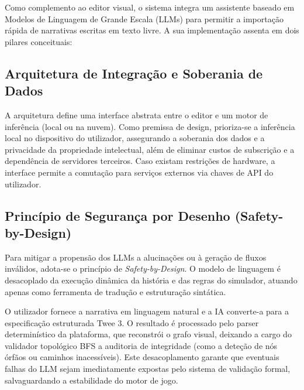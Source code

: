 Como complemento ao editor visual, o sistema integra um assistente baseado em Modelos de Linguagem de Grande Escala (LLMs) para permitir a importação rápida de narrativas escritas em texto livre. A sua implementação assenta em dois pilares conceituais:

\subsection{Arquitetura de Integração e Soberania de Dados}
A arquitetura define uma interface abstrata entre o editor e um motor de inferência (local ou na nuvem). Como premissa de design, prioriza-se a inferência local no dispositivo do utilizador, assegurando a soberania dos dados e a privacidade da propriedade intelectual, além de eliminar custos de subscrição e a dependência de servidores terceiros. Caso existam restrições de hardware, a interface permite a comutação para serviços externos via chaves de API do utilizador.

\subsection{Princípio de Segurança por Desenho (Safety-by-Design)}
Para mitigar a propensão dos LLMs a alucinações ou à geração de fluxos inválidos, adota-se o princípio de \textit{Safety-by-Design}. O modelo de linguagem é desacoplado da execução dinâmica da história e das regras do simulador, atuando apenas como ferramenta de tradução e estruturação sintática. 

O utilizador fornece a narrativa em linguagem natural e a IA converte-a para a especificação estruturada Twee 3. O resultado é processado pelo parser determinístico da plataforma, que reconstrói o grafo visual, deixando a cargo do validador topológico BFS a auditoria de integridade (como a deteção de nós órfãos ou caminhos inacessíveis). Este desacoplamento garante que eventuais falhas do LLM sejam imediatamente expostas pelo sistema de validação formal, salvaguardando a estabilidade do motor de jogo.